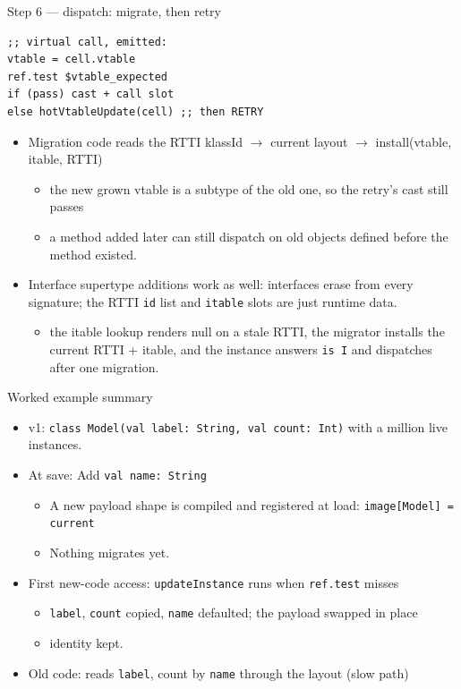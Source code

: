 \documentclass[10pt,presentation]{beamer}
\begin{document}
\begin{frame}[label={sec:orgdfd6fc3},fragile]{Step 6 — dispatch: migrate, then retry}
 \begin{verbatim}
;; virtual call, emitted:
vtable = cell.vtable
ref.test $vtable_expected
if (pass) cast + call slot
else hotVtableUpdate(cell) ;; then RETRY
\end{verbatim}

\begin{itemize}
\item Migration code reads the RTTI klassId \(\to\) current layout \(\to\)
install(vtable, itable, RTTI)
\begin{itemize}
\item the new grown vtable is a \alert{subtype of the old one}, so the
retry's cast still passes
\item a method added later can still dispatch on old objects defined
before the method existed.
\end{itemize}
\item Interface supertype additions work as well: interfaces erase from
every signature; the RTTI \texttt{id} list and \texttt{itable} slots are just
runtime data.
\begin{itemize}
\item the itable lookup renders null on a stale RTTI, the migrator
installs the \alert{current} RTTI + itable, and the instance answers \texttt{is
    I} and dispatches after one migration.
\end{itemize}
\end{itemize}
\end{frame}
\begin{frame}[label={sec:org6c52856},fragile]{Worked example summary}
 \begin{itemize}
\item \alert{v1}: \texttt{class Model(val label: String, val count: Int)} with a
million live instances.
\item \alert{At save}: Add \texttt{val name: String}
\begin{itemize}
\item A new payload shape is compiled and registered at load:
\texttt{image[Model] = current}
\item Nothing migrates yet.
\end{itemize}
\item \alert{First new-code access}: \texttt{updateInstance} runs when \texttt{ref.test}
misses
\begin{itemize}
\item \texttt{label}, \texttt{count} copied, \texttt{name} defaulted; the payload swapped
\alert{in place}
\item identity kept.
\end{itemize}
\item \alert{Old code}: reads \texttt{label}, count by \texttt{name} through the layout (slow path)
\end{itemize}
\end{frame}
\end{document}
